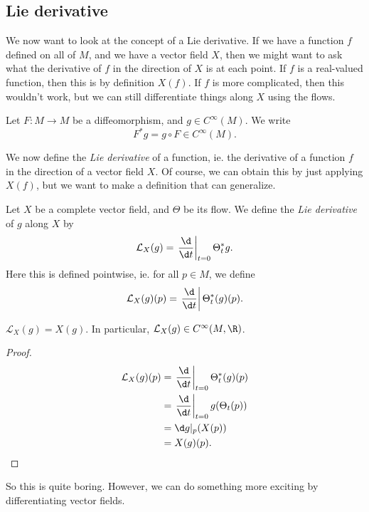 \documentclass[a4paper]{article}
\begin{document}
\subsection{Lie derivative}
We now want to look at the concept of a Lie derivative. If we have a function $f$ defined on all of $M$, and we have a vector field $X$, then we might want to ask what the derivative of $f$ in the direction of $X$ is at each point. If $f$ is a real-valued function, then this is by definition $X(f)$. If $f$ is more complicated, then this wouldn't work, but we can still differentiate things along $X$ using the flows.

\begin{notation}
  Let $F: M \to M$ be a diffeomorphism, and $g \in C^\infty(M)$. We write
  \[
    F^* g = g \circ F \in C^\infty(M).
\]
\end{notation}

We now define the \emph{Lie derivative} of a function, ie. the derivative of a function $f$ in the direction of a vector field $X$. Of course, we can obtain this by just applying $X(f)$, but we want to make a definition that can generalize.

\begin{defi}
  Let $X$ be a complete vector field, and $\Theta$ be its flow. We define the \emph{Lie derivative} of $g$ along $X$ by
  \[
    \mathcal{L}_X(g) = \left.\frac{\d}{\d t} \right|_{t = 0} \Theta_t^* g.
  \]
  Here this is defined pointwise, ie. for all $p \in M$, we define
  \[
    \mathcal{L}_X(g)(p) = \left.\frac{\d}{\d t}\right| \Theta_t^*(g)(p).
  \]
\end{defi}

\begin{lemma}
  $\mathcal{L}_X(g) = X(g)$. In particular, $\mathcal{L}_X(g) \in C^\infty(M, \R)$.
\end{lemma}

\begin{proof}
  \begin{align*}
    \mathcal{L}_X(g)(p) &= \left.\frac{\d}{\d t}\right|_{t = 0} \Theta_t^*(g)(p) \\
    &= \left.\frac{\d}{\d t}\right|_{t = 0} g(\Theta_t(p)) \\
    &= \d g|_p(X(p))\\
    &= X(g)(p). \qedhere
  \end{align*}
\end{proof}

So this is quite boring. However, we can do something more exciting by differentiating vector fields.
\end{document}
